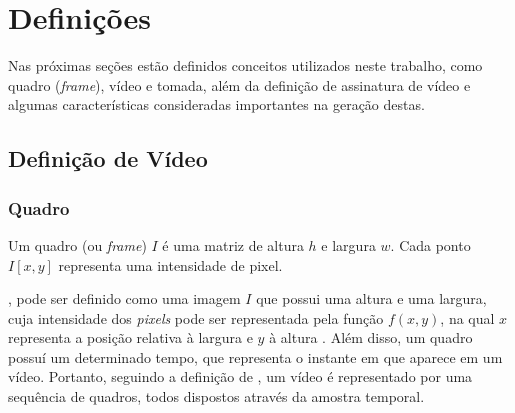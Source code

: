 



\chapter{Definições}
\label{chap:definicoes}

	Nas próximas seções estão definidos conceitos utilizados neste trabalho, como quadro (\textit{frame}), vídeo e tomada, além da definição de assinatura de vídeo e algumas características consideradas importantes na geração destas. 
    
  	\section{Definição de Vídeo}
    \label{sec:video}
    
    \subsection*{Quadro}
    \label{subsec:quadro}
    Um quadro (ou \textit{frame}) $I$ é uma matriz de altura $h$ e largura $w$. Cada ponto $I[x,y]$ representa uma intensidade de pixel.
    
    , pode ser definido como uma imagem $I$ que possui uma altura e uma largura, cuja intensidade dos \textit{pixels} pode ser representada pela função $f(x,y)$, na qual $x$ representa a posição relativa à largura e $y$ à altura \cite{simoes2004detecccao}. Além disso, um quadro possuí um determinado tempo, que representa o instante em que aparece em um vídeo. Portanto, seguindo a definição de \cite{simoes2004detecccao}, um vídeo é representado por uma sequência de quadros, todos dispostos através da amostra temporal.
    
